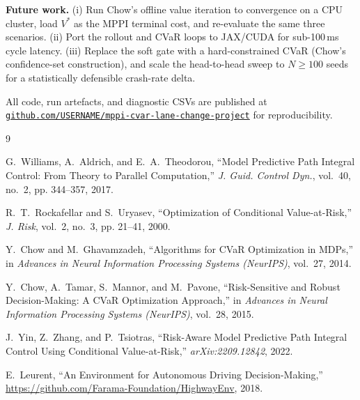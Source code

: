 \documentclass[letterpaper, 10 pt, conference]{ieeeconf}
\newcommand{\repoBase}{https://github.com/USERNAME/mppi-cvar-lane-change-project}
\begin{document}
\textbf{Future work.} (i) Run Chow's offline value iteration to convergence on a CPU cluster, load $V^*$ as the MPPI terminal cost, and re-evaluate the same three scenarios. (ii) Port the rollout and CVaR loops to JAX/CUDA for sub-100\,ms cycle latency. (iii) Replace the soft gate with a hard-constrained CVaR (Chow's confidence-set construction), and scale the head-to-head sweep to $N \ge 100$ seeds for a statistically defensible crash-rate delta.

All code, run artefacts, and diagnostic CSVs are published at \href{\repoBase}{\texttt{github.com/USERNAME/mppi-cvar-lane-change-project}} for reproducibility.

\begin{thebibliography}{9}

G.~Williams, A.~Aldrich, and E.~A.~Theodorou,
``Model Predictive Path Integral Control: From Theory to Parallel Computation,''
\emph{J. Guid. Control Dyn.}, vol.~40, no.~2, pp. 344--357, 2017.

R.~T.~Rockafellar and S.~Uryasev,
``Optimization of Conditional Value-at-Risk,''
\emph{J. Risk}, vol.~2, no.~3, pp. 21--41, 2000.

Y.~Chow and M.~Ghavamzadeh,
``Algorithms for CVaR Optimization in MDPs,''
in \emph{Advances in Neural Information Processing Systems (NeurIPS)}, vol.~27, 2014.

Y.~Chow, A.~Tamar, S.~Mannor, and M.~Pavone,
``Risk-Sensitive and Robust Decision-Making: A CVaR Optimization Approach,''
in \emph{Advances in Neural Information Processing Systems (NeurIPS)}, vol.~28, 2015.

J.~Yin, Z.~Zhang, and P.~Tsiotras,
``Risk-Aware Model Predictive Path Integral Control Using Conditional Value-at-Risk,''
\emph{arXiv:2209.12842}, 2022.

E.~Leurent,
``An Environment for Autonomous Driving Decision-Making,''
\url{https://github.com/Farama-Foundation/HighwayEnv}, 2018.

\end{thebibliography}
\end{document}
